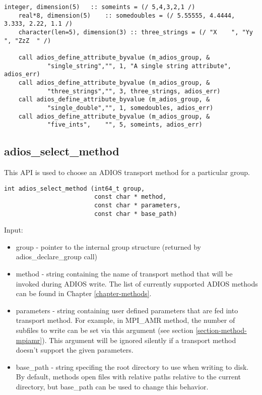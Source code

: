 \begin{lstlisting}[alsolanguage=Fortran,caption={},label={}]
    integer, dimension(5)   :: someints = (/ 5,4,3,2,1 /)
    real*8, dimension(5)    :: somedoubles = (/ 5.55555, 4.4444, 3.333, 2.22, 1.1 /)
    character(len=5), dimension(3) :: three_strings = (/ "X    ", "Yy   ", "ZzZ  " /)

    call adios_define_attribute_byvalue (m_adios_group, &
            "single_string","", 1, "A single string attribute", adios_err)
    call adios_define_attribute_byvalue (m_adios_group, &
            "three_strings","", 3, three_strings, adios_err)
    call adios_define_attribute_byvalue (m_adios_group, &
            "single_double","", 1, somedoubles, adios_err)
    call adios_define_attribute_byvalue (m_adios_group, &
            "five_ints",    "", 5, someints, adios_err)
\end{lstlisting}


\subsection{adios\_select\_method}
This API is used to choose an ADIOS transport method for a particular group. 

\begin{lstlisting}[alsolanguage=C,caption={},label={}]
int adios_select_method (int64_t group, 
                         const char * method,
                         const char * parameters,
                         const char * base_path)
\end{lstlisting}

Input:
\begin{itemize}
\item group - pointer to the internal group structure (returned by adios\_declare\_group 
call)

\item method - string containing the name of transport method that will be invoked during 
ADIOS write. The list of currently supported ADIOS methods can be found in Chapter 
\ref{chapter-methods}.

\item parameters - string containing user defined parameters that are fed into transport 
method.  For example, in MPI\_AMR method, the number of subfiles to write can be 
set via this argument (see section \ref{section-method-mpiamr}).
This argument will be ignored silently if a transport method doesn't support 
the given parameters.

\item base\_path -  string specifing the root directory to use when writing to disk. 
By default, methods open files with relative paths relative to the current directory, 
but base\_path can be used to change this behavior.
\end{itemize}

